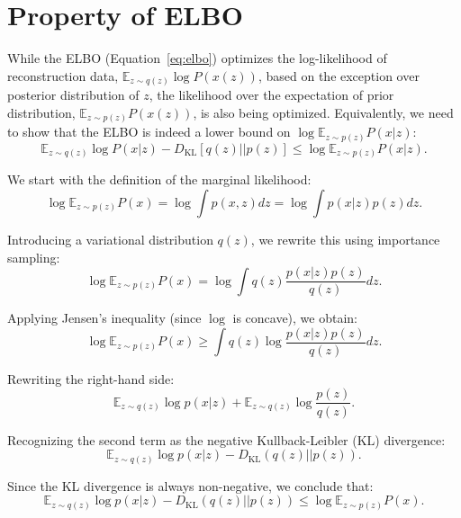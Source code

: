 \section{Property of ELBO}
\label{appendix:elbo}

While the ELBO (Equation~\ref{eq:elbo}) optimizes the log-likelihood of reconstruction data, $\mathbb{E}_{z\sim q(z)} \log P(x(z))$, based on the exception over posterior distribution of $z$, the likelihood over the expectation of prior distribution, $\mathbb{E}_{z\sim p(z)}P(x(z))$, is also being optimized. Equivalently, we need to show that the ELBO is indeed a lower bound on $\log \mathbb{E}_{z\sim p(z)} P(x|z)$:
\begin{equation}
    \mathbb{E}_{z\sim q(z)} \log P(x|z) - D_{\mathrm{KL}}\left[q(z)||p(z)\right] \leq \log \mathbb{E}_{z\sim p(z)} P(x|z).
\end{equation}

We start with the definition of the marginal likelihood:
\begin{equation}
    \log \mathbb{E}_{z\sim p(z)} P(x) = \log \int p(x, z) dz = \log \int p(x|z) p(z) dz.
\end{equation}

Introducing a variational distribution $q(z)$, we rewrite this using importance sampling:
\begin{equation}
    \log \mathbb{E}_{z\sim p(z)} P(x) = \log \int q(z) \frac{p(x|z) p(z)}{q(z)} dz.
\end{equation}

Applying Jensen's inequality (since $\log$ is concave), we obtain:
\begin{equation}
    \log \mathbb{E}_{z\sim p(z)} P(x) \geq \int q(z) \log \frac{p(x|z) p(z)}{q(z)} dz.
\end{equation}

Rewriting the right-hand side:
\begin{equation}
    \mathbb{E}_{z\sim q(z)} \log p(x|z) + \mathbb{E}_{z\sim q(z)} \log \frac{p(z)}{q(z)}.
\end{equation}

Recognizing the second term as the negative Kullback-Leibler (KL) divergence:
\begin{equation}
    \mathbb{E}_{z\sim q(z)} \log p(x|z) - D_{\mathrm{KL}}(q(z) || p(z)).
\end{equation}

Since the KL divergence is always non-negative, we conclude that:
\begin{equation}
    \mathbb{E}_{z\sim q(z)} \log p(x|z) - D_{\mathrm{KL}}(q(z) || p(z)) \leq \log \mathbb{E}_{z\sim p(z)} P(x).
\end{equation}

